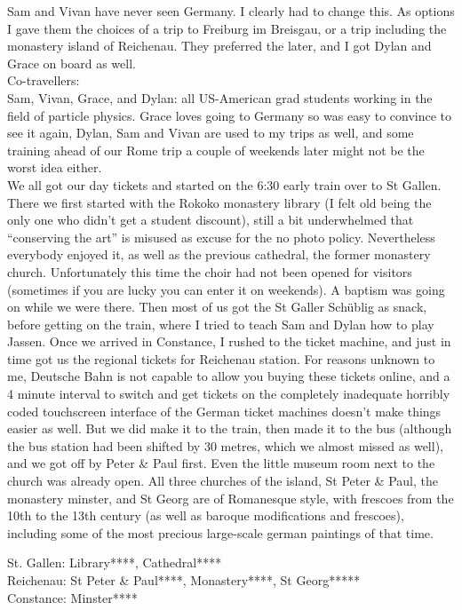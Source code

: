 Sam and Vivan have never seen Germany. I clearly had to change this. As options I gave them the choices of a trip to Freiburg im Breisgau, or a trip including the monastery island of Reichenau. They preferred the later, and I got Dylan and Grace on board as well.\\

Co-travellers:\\
Sam, Vivan, Grace, and Dylan: all US-American grad students working in the field of particle physics. Grace loves going to Germany so was easy to convince to see it again, Dylan, Sam and Vivan are used to my trips as well, and some training ahead of our Rome trip a couple of weekends later might not be the worst idea either.\\

We all got our day tickets and started on the 6:30 early train over to St Gallen. There we first started with the Rokoko monastery library (I felt old being the only one who didn't get a student discount), still a bit underwhelmed that ``conserving the art'' is misused as excuse for the no photo policy. Nevertheless everybody enjoyed it, as well as the previous cathedral, the former monastery church. Unfortunately this time the choir had not been opened for visitors (sometimes if you are lucky you can enter it on weekends). A baptism was going on while we were there. Then most of us got the St Galler Sch\"ublig as snack, before getting on the train, where I tried to teach Sam and Dylan how to play Jassen. Once we arrived in Constance, I rushed to the ticket machine, and just in time got us the regional tickets for Reichenau station. For reasons unknown to me, Deutsche Bahn is not capable to allow you buying these tickets online, and a 4 minute interval to switch and get tickets on the completely inadequate horribly coded touchscreen interface of the German ticket machines doesn't make things easier as well. But we did make it to the train, then made it to the bus (although the bus station had been shifted by 30 metres, which we almost missed as well), and we got off by Peter \& Paul first. Even the little museum room next to the church was already open. All three churches of the island, St Peter \& Paul, the monastery minster, and St Georg are of Romanesque style, with frescoes from the 10th to the 13th century (as well as baroque modifications and frescoes), including some of the most precious large-scale german paintings of that time.

St. Gallen: Library****, Cathedral****\\
Reichenau: St Peter \& Paul****, Monastery****, St Georg*****\\
Constance: Minster****

